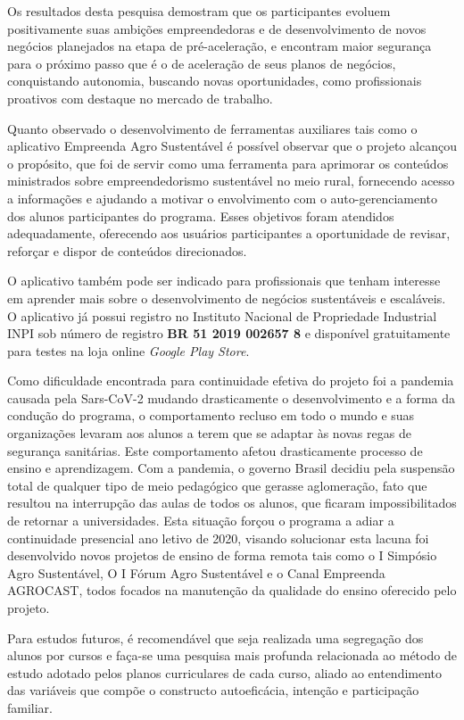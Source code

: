 Os resultados desta pesquisa demostram que os participantes evoluem positivamente suas ambições empreendedoras e de desenvolvimento de novos negócios planejados na etapa de pré-aceleração, e encontram maior segurança para o próximo passo que é o de aceleração de seus planos de negócios, conquistando autonomia, buscando novas oportunidades, como profissionais proativos com destaque no mercado de trabalho.

Quanto observado o desenvolvimento de ferramentas auxiliares tais como o aplicativo Empreenda Agro Sustentável é possível observar que o projeto alcançou o propósito, que foi de servir como uma ferramenta para aprimorar os conteúdos ministrados sobre empreendedorismo sustentável no meio rural, fornecendo acesso a informações e ajudando a motivar o envolvimento com o auto-gerenciamento dos alunos participantes do programa. Esses objetivos foram atendidos adequadamente, oferecendo aos usuários participantes a oportunidade de revisar, reforçar e dispor de conteúdos direcionados.

O aplicativo também pode ser indicado para profissionais que tenham interesse em aprender mais sobre o desenvolvimento de negócios sustentáveis e escaláveis. O aplicativo já possui registro no Instituto Nacional de Propriedade Industrial INPI sob número de registro \textbf{BR 51 2019 002657 8} e disponível gratuitamente para testes na loja online \textit{Google Play Store}.


Como dificuldade encontrada para continuidade efetiva do projeto foi a pandemia causada pela Sars-CoV-2 mudando drasticamente o desenvolvimento e a forma da condução do programa, o comportamento recluso em todo o mundo  e suas organizações levaram aos alunos a terem que se adaptar às novas regas de segurança sanitárias. Este comportamento afetou drasticamente  processo de ensino e aprendizagem. Com a pandemia, o governo Brasil decidiu pela suspensão total de qualquer tipo de meio pedagógico que gerasse aglomeração, fato que resultou na interrupção das aulas de todos os alunos, que ficaram impossibilitados de retornar a universidades. Esta situação forçou o programa a adiar a continuidade presencial ano letivo de 2020, visando solucionar esta lacuna foi desenvolvido novos projetos de ensino de forma remota tais como o I Simpósio Agro Sustentável, O I Fórum Agro Sustentável e o Canal Empreenda AGROCAST, todos focados na manutenção da qualidade do ensino oferecido pelo projeto.

Para estudos futuros, é recomendável que seja realizada uma segregação dos alunos por cursos e faça-se uma pesquisa mais profunda relacionada ao método de estudo adotado pelos planos curriculares de cada curso, aliado ao entendimento das variáveis que compõe o constructo autoeficácia, intenção e participação familiar.

